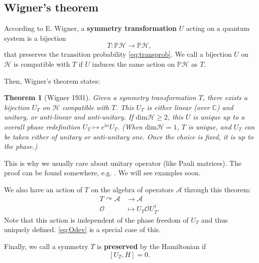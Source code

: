 \documentclass[
]{scrartcl}
\numberwithin{equation}{section}
\newtheorem{theorem}{Theorem}[section]
\theoremstyle{definition}
\theoremstyle{definition}
\theoremstyle{definition}
\theoremstyle{definition}
\theoremstyle{remark}
\begin{document}
\hypertarget{wigners-theorem}{%
\subsection{Wigner's theorem}\label{wigners-theorem}}

According to E. Wigner, a \textbf{symmetry transformation} \(U\) acting on a quantum system is a bijection
\begin{equation}
  \label{eq:sym}
  T: \mathbb{P}\mathcal{H} \to \mathbb{P}\mathcal{H},
\end{equation}
that preserves the transition probability \eqref{eq:transprob}.
We call a bijection \(U\) on \(\mathcal{H}\) is compatible with \(T\) if \(U\) induces the same action on \(\mathbb{P}\mathcal{H}\) as \(T\).

Then, Wigner's theorem states:

\begin{theorem}[Wigner 1931]
Given a symmetry transformation \(T\), there exists a bijection \(U_T\) on \(\mathcal{H}\) compatible with \(T\).
This \(U_T\) is either linear (over \(\mathbb{C}\)) and unitary, or anti-linear and anti-unitary. If \(\mathrm{dim}\mathcal{H}\ge 2\), this \(U\) is unique up to a overall phase redefinition \(U_T \mapsto e^{\mathrm{i}\alpha}U_T\). (When \(\mathrm{dim}\mathcal{H} = 1\), \(T\) is unique, and \(U_T\) can be taken either of unitary or anti-unitary one. Once the choice is fixed, it is up to the phase.)
\end{theorem}

This is why we usually care about unitary operator (like Pauli matrices).
The proof can be found somewhere, e.g. \textcite{Weinberg:1995mt}. We will see examples soon.

We also have an action of \(T\) on the algebra of operators \(\mathcal{A}\) through this theorem:
\begin{align}
  \label{eq:TonA}
  T \curvearrowright \mathcal{A}  & \to \mathcal{A}\\
  \mathcal{O} & \mapsto U_T \mathcal{O} U^\dagger_T.
\end{align}
Note that this action is independent of the phase freedom of \(U_T\) and thus uniquely defined.
\eqref{eq:Odev} is a special case of this.

Finally, we call a symmetry \(T\) is \textbf{preserved} by the Hamiltonian if
\begin{equation}
  \label{eq:UHcommute}
  [U_T,H] = 0.
\end{equation}
\end{document}
